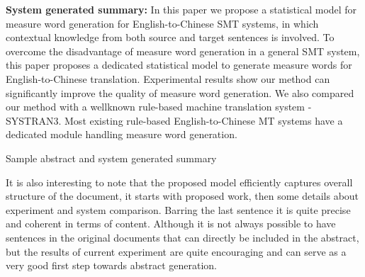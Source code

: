 \begin{InfoBox}[H]
{\begin{minipage}{0.9\linewidth}
\textbf{System generated summary: }
 In this paper we propose a statistical model for measure word generation for English-to-Chinese SMT systems, in which contextual knowledge from both source and target sentences is involved. To overcome the disadvantage of measure word generation in a general SMT system, this paper proposes a dedicated statistical model to generate measure words for English-to-Chinese translation. Experimental results show our method can significantly improve the quality of measure word generation. We also compared our method with a wellknown rule-based machine translation system - SYSTRAN3. Most existing rule-based English-to-Chinese MT systems have a dedicated module handling measure word generation. 
%
\end{minipage}
}
\caption*{Sample abstract and system generated summary}
\end{InfoBox}
\vspace{-2mm}
It is also interesting to note that the proposed model efficiently captures overall structure of the document, it starts with proposed work, then some details about experiment and system comparison. Barring the last sentence it is quite precise and coherent in terms of content. Although it is not always possible to have sentences in the original documents that can directly be included in the abstract, but the results of current experiment are quite encouraging and can serve as a very good first step towards abstract generation. 

